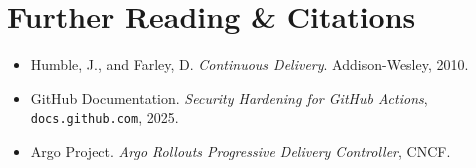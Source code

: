 \section{Further Reading \protect\& Citations}
\begin{itemize}[leftmargin=15pt]
  \item Humble, J., and Farley, D. \emph{Continuous Delivery}. Addison-Wesley, 2010.
  \item GitHub Documentation. \emph{Security Hardening for GitHub Actions}, \texttt{docs.github.com}, 2025.
  \item Argo Project. \emph{Argo Rollouts Progressive Delivery Controller}, CNCF.
\end{itemize}
